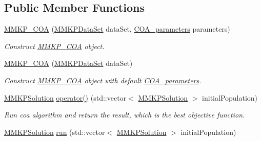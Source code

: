 \subsection*{Public Member Functions}
\begin{DoxyCompactItemize}
\item 
\hyperlink{class_m_m_k_p___c_o_a_a2e4aa7231d624a4196c66b054895de23}{M\+M\+K\+P\+\_\+\+C\+O\+A} (\hyperlink{class_m_m_k_p_data_set}{M\+M\+K\+P\+Data\+Set} data\+Set, \hyperlink{class_c_o_a__parameters}{C\+O\+A\+\_\+parameters} parameters)
\begin{DoxyCompactList}\small\item\em Construct \hyperlink{class_m_m_k_p___c_o_a}{M\+M\+K\+P\+\_\+\+C\+O\+A} object. \end{DoxyCompactList}\item 
\hypertarget{class_m_m_k_p___c_o_a_a5baac5ab29b64bfd611386d13261a386}{\hyperlink{class_m_m_k_p___c_o_a_a5baac5ab29b64bfd611386d13261a386}{M\+M\+K\+P\+\_\+\+C\+O\+A} (\hyperlink{class_m_m_k_p_data_set}{M\+M\+K\+P\+Data\+Set} data\+Set)}\label{class_m_m_k_p___c_o_a_a5baac5ab29b64bfd611386d13261a386}

\begin{DoxyCompactList}\small\item\em Construct \hyperlink{class_m_m_k_p___c_o_a}{M\+M\+K\+P\+\_\+\+C\+O\+A} object with default \hyperlink{class_c_o_a__parameters}{C\+O\+A\+\_\+parameters}. \end{DoxyCompactList}\item 
\hypertarget{class_m_m_k_p___c_o_a_a026f7d04ec0818ab26c614cb9f6b4674}{\hyperlink{class_m_m_k_p_solution}{M\+M\+K\+P\+Solution} \hyperlink{class_m_m_k_p___c_o_a_a026f7d04ec0818ab26c614cb9f6b4674}{operator()} (std\+::vector$<$ \hyperlink{class_m_m_k_p_solution}{M\+M\+K\+P\+Solution} $>$ initial\+Population)}\label{class_m_m_k_p___c_o_a_a026f7d04ec0818ab26c614cb9f6b4674}

\begin{DoxyCompactList}\small\item\em Run coa algorithm and return the result, which is the best objective function. \end{DoxyCompactList}\item 
\hypertarget{class_m_m_k_p___c_o_a_ab755ccee72965beb20b782cb93ff7687}{\hyperlink{class_m_m_k_p_solution}{M\+M\+K\+P\+Solution} \hyperlink{class_m_m_k_p___c_o_a_ab755ccee72965beb20b782cb93ff7687}{run} (std\+::vector$<$ \hyperlink{class_m_m_k_p_solution}{M\+M\+K\+P\+Solution} $>$ initial\+Population)}\label{class_m_m_k_p___c_o_a_ab755ccee72965beb20b782cb93ff7687}


\end{DoxyCompactItemize}
